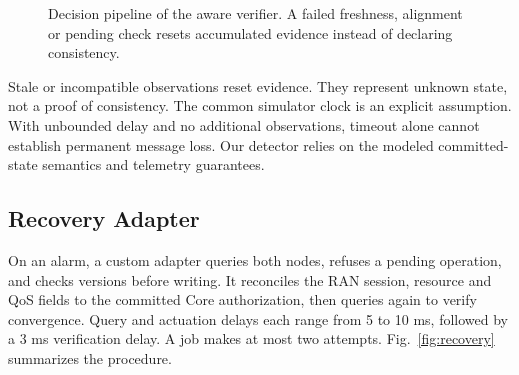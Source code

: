 \documentclass[conference]{IEEEtran}
\begin{document}
\begin{figure}[t]
\centering
{}
\caption{Decision pipeline of the aware verifier. A failed freshness, alignment or pending check resets accumulated evidence instead of declaring consistency.}
\label{fig:verifier}
\end{figure}

Stale or incompatible observations reset evidence. They represent unknown state, not a proof of consistency. The common simulator clock is an explicit assumption. With unbounded delay and no additional observations, timeout alone cannot establish permanent message loss. Our detector relies on the modeled committed-state semantics and telemetry guarantees.

\subsection{Recovery Adapter}
On an alarm, a custom adapter queries both nodes, refuses a pending operation, and checks versions before writing. It reconciles the RAN session, resource and QoS fields to the committed Core authorization, then queries again to verify convergence. Query and actuation delays each range from 5 to 10 ms, followed by a 3 ms verification delay. A job makes at most two attempts. Fig.~\ref{fig:recovery} summarizes the procedure.
\end{document}
